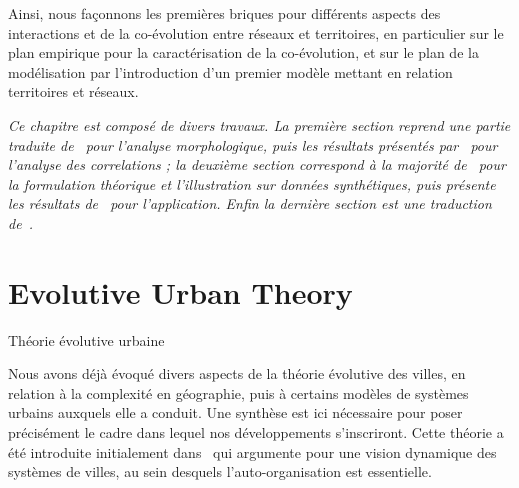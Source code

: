 Ainsi, nous façonnons les premières briques pour différents aspects des interactions et de la co-évolution entre réseaux et territoires, en particulier sur le plan empirique pour la caractérisation de la co-évolution, et sur le plan de la modélisation par l'introduction d'un premier modèle mettant en relation territoires et réseaux.






\stars


\textit{Ce chapitre est composé de divers travaux. La première section reprend une partie traduite de~\cite{raimbault2017calibration} pour l'analyse morphologique, puis les résultats présentés par~\cite{raimbault2016cautious} pour l'analyse des correlations ; la deuxième section correspond à la majorité de~\cite{raimbault2017identification} pour la formulation théorique et l'illustration sur données synthétiques, puis présente les résultats de~\cite{raimbault:halshs-01584914} pour l'application. Enfin la dernière section est une traduction de~\cite{raimbault2017indirect}.}





\newpage


\section*{Evolutive Urban Theory}{Théorie évolutive urbaine}



Nous avons déjà évoqué divers aspects de la théorie évolutive des villes, en relation à la complexité en géographie, puis à certains modèles de systèmes urbains auxquels elle a conduit. Une synthèse est ici nécessaire pour poser précisément le cadre dans lequel nos développements s'inscriront. Cette théorie a été introduite initialement dans~\cite{pumain1997pour} qui argumente pour une vision dynamique des systèmes de villes, au sein desquels l'auto-organisation est essentielle.


